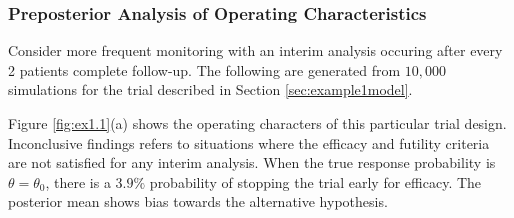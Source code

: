 \documentclass[useAMS,usenatbib,referee]{biom}
\begin{document}
\subsubsection{Preposterior Analysis of Operating Characteristics}\label{sec:ex1.1}
Consider more frequent monitoring with an interim analysis occuring after every 2 patients complete follow-up. The following are generated from $10,000$ simulations for the trial described in Section \ref{sec:example1model}.

Figure \ref{fig:ex1.1}(a) shows the operating characters of this particular trial design.
%
Inconclusive findings refers to situations where the efficacy and futility criteria are not satisfied for any interim analysis.
%
When the true response probability is $\theta=\theta_0$, there is a $3.9\%$ probability of stopping the trial early for efficacy. 
%
The posterior mean shows bias towards the alternative hypothesis.
\end{document}
